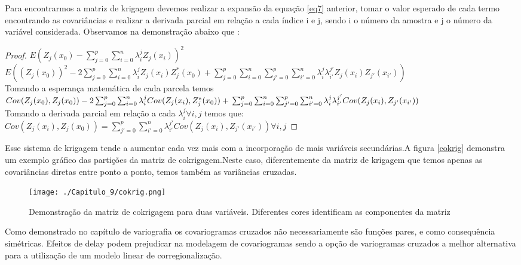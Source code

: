 Para encontrarmos a matriz de krigagem devemos realizar a expansão da equação \eqref{eq7} anterior, tomar o valor esperado de cada termo encontrando as covariâncias e realizar a derivada parcial em relação a cada índice i e j, sendo i o número da amostra e j o número da variável considerada. Observamos na demonstração abaixo que :

 
\begin{proof}
	 $E\left( Z_{j} (x_{0}) - \sum_{j=0}^{p}\sum_{i=0}^{n} \lambda^j_{i} Z_j(x_{i})\right)^2$
	 \\
	 $E\left( (Z_{j} (x_{0}))^2 -2\sum_{j=0}^{p}\sum_{i=0}^{n} \lambda^j_{i} Z_j(x_{i})Z^*_{j} (x_{0}) + \sum_{j=0}^{p}\sum_{i=0}^{n} \sum_{j'=0}^{p}\sum_{i'=0}^{n}\lambda^j_{i}\lambda^{j'}_{i'} Z_j(x_{i})Z_{j'}(x_{i'})  \right)$
	 \\
	 Tomando a esperança matemática de cada parcela temos
	 \\
	 $Cov(Z_{j} (x_{0}),Z_{j} (x_{0}) ) -2\sum_{j=0}^{p}\sum_{i=0}^{n} \lambda^j_{i} Cov(Z_j(x_{i}),Z^*_{j} (x_{0})) + \\ \sum_{j=0}^{p}\sum_{i=0}^{n} \sum_{j'=0}^{p}\sum_{i'=0}^{n}\lambda^j_{i}\lambda^{j'}_{i'} Cov(Z_j(x_{i}),Z_{j'}(x_{i'}))$\\
	 Tomando a derivada parcial em relação a cada $\lambda^j_{i} \forall i,j$ temos que:
	 \\
	 $Cov(Z_{j}(x_{i}),Z_{j} (x_{0}))=\sum_{j'=0}^{p}\sum_{i'=0}^{n}\lambda^{j'}_{i'}Cov(Z_j(x_{i}),Z_{j'}(x_{i'})) \forall i,j$
\end{proof}

Esse sistema de krigagem tende a aumentar cada vez mais com a incorporação de mais variáveis secundárias.A figura \eqref{cokrig} demonstra um exemplo gráfico das partições da matriz de cokrigagem.Neste caso, diferentemente da matriz de krigagem que temos apenas as covariâncias diretas entre ponto a ponto, temos também as variâncias cruzadas.

\begin{figure}[H]
	\centering
	\texttt{[image: ./Capitulo\_9/cokrig.png]}	
	\caption{Demonstração da matriz de cokrigagem para duas variáveis. Diferentes cores identificam as componentes da matriz}
	\label{cokrig}
\end{figure} 

Como demonstrado no capítulo de variografia os covariogramas cruzados não necessariamente são funções pares, e como consequência simétricas. Efeitos de delay podem prejudicar na modelagem de covariogramas sendo a opção de variogramas cruzados a melhor alternativa para a utilização de um modelo linear de corregionalização. 

